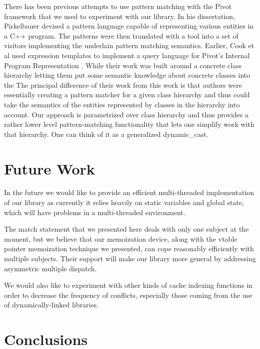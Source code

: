 \documentclass[preprint]{sigplanconf}
\begin{document}
There has been previous attempts to use pattern matching with the Pivot 
framework that we used to experiment with our library. In his dissertation, 
Pirkelbauer devised a pattern language capable of representing various entities 
in a C++ program. The patterns were then translated with a tool into a set of 
visitors implementing the underlain pattern matching 
semantics\cite{PirkelbauerThesis}. Earlier, Cook et al used expression templates 
to implement a query language for Pivot's Internal Program Representation 
\cite{iql04}. While their work was built around a concrete class hierarchy 
letting them put some semantic knowledge about concrete classes into the 
The principal difference of their work from this work is that 
authors were essentially creating a pattern matcher for a given class hierarchy 
and thus could take the semantics of the entities represented by classes in the 
hierarchy into account. Our approach is parametrized over class hierarchy and 
thus provides a rather lower level pattern-matching functionality that lets one 
simplify work with that hierarchy.  One can think of it as a generalized 
dynamic\_cast.

\section{Future Work} %
\label{sec:fw}

In the future we would like to provide an efficient multi-threaded 
implementation of our library as currently it relies heavily on static variables 
and global state, which will have problems in a multi-threaded environment. 

The match statement that we presented here deals with only one subject at the 
moment, but we believe that our memoization device, along with the vtable pointer memoization 
technique we presented, can cope reasonably efficiently with multiple subjects. 
Their support will make our library more general by addressing asymmetric 
multiple dispatch.

We would also like to experiment with other kinds of cache indexing functions in 
order to decrease the frequency of conflicts, especially those coming from the use 
of dynamically-linked libraries.

\section{Conclusions} %
\label{sec:cc}
\end{document}
